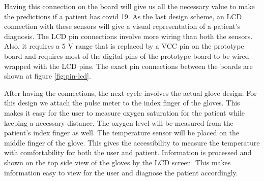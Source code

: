 \documentclass[10pt, conference]{IEEEtran}
\begin{document}
Having this connection on the board  will give us all the necessary value to make the predictions if a patient has covid 19. As the last design scheme, an LCD connection with these sensors will give a visual representation of a patient's diagnosis. The LCD pin connections involve more wiring than both the sensors. Also, it  requires a 5 V range that is replaced by a VCC pin on the prototype board and requires most of the digital pins of the prototype board to be wired wrapped with the LCD pins. The exact pin connections between the boards are shown at figure \ref{fig:pin-lcd}.

After having the connections, the next cycle involves the actual glove design. For this design we attach the pulse meter to the index finger of the gloves. This makes it easy for the user to measure oxygen saturation for the patient while keeping a necessary distance. The oxygen level will be measured from the patient's index finger as well. The temperature sensor will be placed on the middle finger of the glove. This gives the accessibility to measure the temperature with comfortability for both the user and patient. Information is processed and shown on the top side view of the gloves by the LCD screen. This makes information easy to view for the user and diagnose the patient accordingly. 



\end{document}
